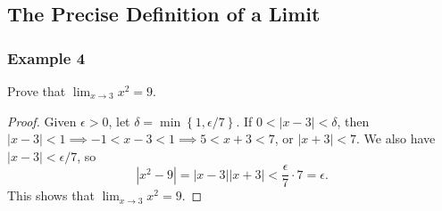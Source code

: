 \documentclass{article}
\begin{document}
\subsection{The Precise Definition of a Limit}
\subsubsection*{Example 4} Prove that $\lim_{x\to3}x^2 = 9$.
\begin{proof}
  Given $\epsilon > 0$, let $\delta = \min\left\{1, \epsilon / 7\right\}$. If $0 < |x-3| <
    \delta$, then $|x-3| < 1 \implies -1 < x-3 < 1 \implies 5 < x+3 < 7$, or $|x+3| < 7$.
  We also have $|x-3| < \epsilon/7$, so
  \[\left|x^2-9\right| = |x-3||x+3| < \frac{\epsilon}{7}\cdot7 = \epsilon.\]
  This shows that $\lim_{x\to3}x^2 = 9$.
\end{proof}
\end{document}
